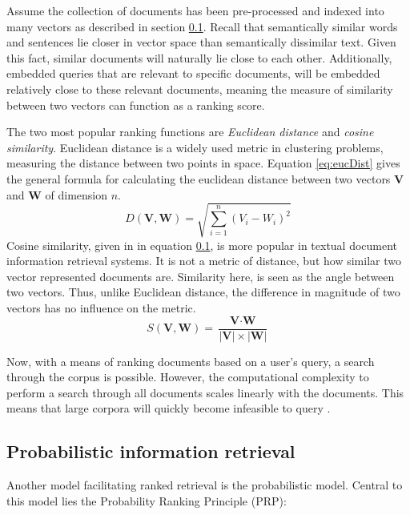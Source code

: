 \documentclass[twoside]{uva-inf-bachelor-thesis}
\begin{document}
Assume the collection of documents has been pre-processed and indexed into many vectors as described in section \ref{}. Recall that semantically similar words and sentences lie closer in vector space than semantically dissimilar text. Given this fact, similar documents will naturally lie close to each other. Additionally, embedded queries that are relevant to specific documents, will be embedded relatively close to these relevant documents, meaning the measure of similarity between two vectors can function as a ranking score.

The two most popular ranking functions are \textit{Euclidean distance} and \textit{cosine similarity}. Euclidean distance is a widely used metric in clustering problems, measuring the distance between two points in space. Equation \ref{eq:eucDist} gives the general formula for calculating the euclidean distance between two vectors $\textbf{V}$ and $\textbf{W}$ of dimension $n$. \cite{huang2008similarity}
\begin{equation}\label{eq:eucDist}
    D(\textbf{V}, \textbf{W}) = \sqrt{\sum_{i=1}^{n} (V_{i} - W_{i})^{2}}
\end{equation}
Cosine similarity, given in in equation \ref{}, is more popular in textual document information retrieval systems. It is not a metric of distance, but how similar two vector represented documents are. Similarity here, is seen as the angle between two vectors. Thus, unlike Euclidean distance, the difference in magnitude of two vectors has no influence on the metric. \cite{huang2008similarity, rahutomo2012semantic, manning08IR}
\begin{equation}\label{eq:cossim}
    S(\textbf{V}, \textbf{W}) = \frac{\textbf{V} \cdot \textbf{W}}{\lvert \textbf{V} \rvert \times \lvert \textbf{W} \rvert}
\end{equation}

Now, with a means of ranking documents based on a user's query, a search through the corpus is possible. However, the computational complexity to perform a search through all documents scales linearly with the documents. This means that large corpora will quickly become infeasible to query \cite{malkov2018efficient}.

\subsection{Probabilistic information retrieval}
Another model facilitating ranked retrieval is the probabilistic model. Central to this model lies the Probability Ranking Principle (PRP):
\end{document}
